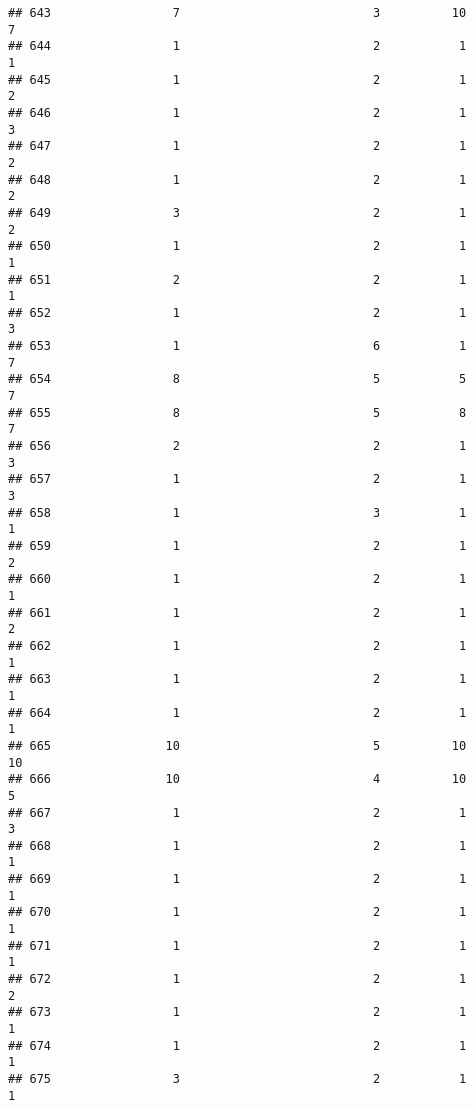 \documentclass[
]{article}
\begin{document}
\begin{verbatim}
## 643                 7                           3          10               7
## 644                 1                           2           1               1
## 645                 1                           2           1               2
## 646                 1                           2           1               3
## 647                 1                           2           1               2
## 648                 1                           2           1               2
## 649                 3                           2           1               2
## 650                 1                           2           1               1
## 651                 2                           2           1               1
## 652                 1                           2           1               3
## 653                 1                           6           1               7
## 654                 8                           5           5               7
## 655                 8                           5           8               7
## 656                 2                           2           1               3
## 657                 1                           2           1               3
## 658                 1                           3           1               1
## 659                 1                           2           1               2
## 660                 1                           2           1               1
## 661                 1                           2           1               2
## 662                 1                           2           1               1
## 663                 1                           2           1               1
## 664                 1                           2           1               1
## 665                10                           5          10              10
## 666                10                           4          10               5
## 667                 1                           2           1               3
## 668                 1                           2           1               1
## 669                 1                           2           1               1
## 670                 1                           2           1               1
## 671                 1                           2           1               1
## 672                 1                           2           1               2
## 673                 1                           2           1               1
## 674                 1                           2           1               1
## 675                 3                           2           1               1

\end{verbatim}
\end{document}
